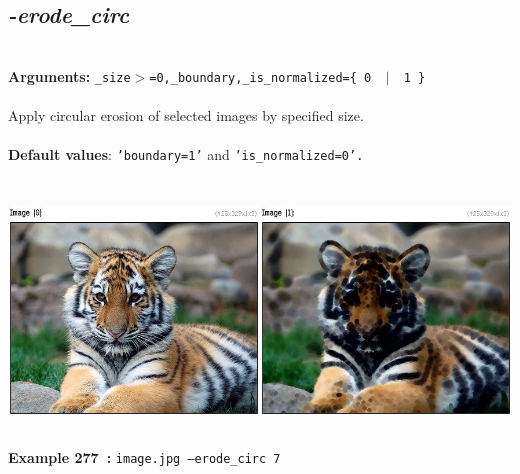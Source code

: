 \documentclass[a4paper,11pt,twoside]{book}
\begin{document}
\subsection{\emph{-erode\_circ} }\vspace*{-0.5em}
~\\\textbf{Arguments: } 
{\small \texttt{\_size$>$=0,\_boundary,\_is\_normalized=\{ 0 ~$|$~ 1 \}}}\\~\\
Apply circular erosion of selected images by specified size.
~\\~\\\textbf{Default values}: {\small \texttt{'boundary=1'} and \texttt{'is\_normalized=0'.}}
\begin{center}\includegraphics[keepaspectratio=true,height=7cm,width=\textwidth]{img/gmic_def277.jpg}\\
{\footnotesize \textbf{Example 277~:} \texttt{image.jpg --erode\_circ 7}}
\end{center}
\end{document}
